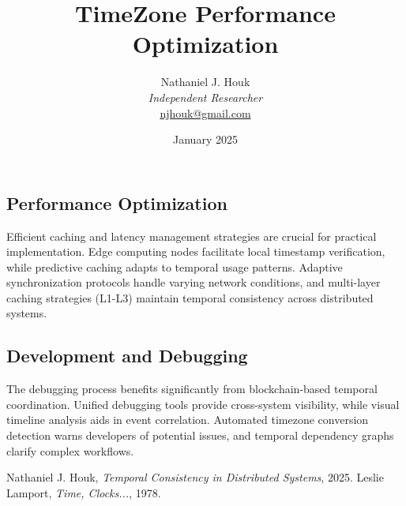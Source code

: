 \documentclass{article}
\title{TimeZone Performance Optimization}
\author{Nathaniel J. Houk\\
\textit{Independent Researcher}\\
\href{mailto:njhouk@gmail.com}{njhouk@gmail.com}}
\date{January 2025}
\begin{document}
\maketitle
\tableofcontents

\subsection{Performance Optimization}
Efficient caching and latency management strategies are crucial for practical implementation. Edge computing nodes facilitate local timestamp verification, while predictive caching adapts to temporal usage patterns. Adaptive synchronization protocols handle varying network conditions, and multi-layer caching strategies (L1-L3) maintain temporal consistency across distributed systems.

\subsection{Development and Debugging}
The debugging process benefits significantly from blockchain-based temporal coordination. Unified debugging tools provide cross-system visibility, while visual timeline analysis aids in event correlation. Automated timezone conversion detection warns developers of potential issues, and temporal dependency graphs clarify complex workflows.

\begin{thebibliography}{9}
 Nathaniel J. Houk, \textit{Temporal Consistency in Distributed Systems}, 2025.
 Leslie Lamport, \textit{Time, Clocks...}, 1978.
\end{thebibliography}
\end{document}
